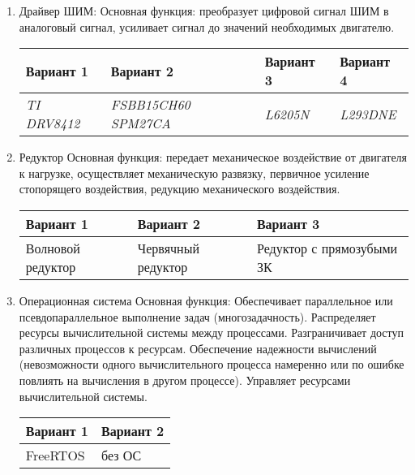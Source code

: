 \begin{enumerate}
    \item Драйвер ШИМ:
        Основная функция: преобразует цифровой сигнал ШИМ в аналоговый сигнал,
        усиливает сигнал до значений необходимых двигателю.

        \begin{tabular}{|p{3.5cm}|p{3.5cm}|p{3.5cm}|p{3.5cm}|}
            \hline
            Вариант 1 & Вариант 2 & Вариант 3 & Вариант 4 \\
            \hline
            \textit{TI DRV8412} &
            \textit{FSBB15CH60 SPM27CA} &
            \textit{L6205N} &
            \textit{L293DNE} \\
            \hline
        \end{tabular}

    \item Редуктор
        Основная функция: передает механическое воздействие от двигателя к
        нагрузке, осуществляет механическую развязку, первичное усиление
        стопорящего воздействия, редукцию механического воздействия.

        \begin{tabular}{|p{3.5cm}|p{3.5cm}|p{3.5cm}|}
            \hline
            Вариант 1 & Вариант 2 & Вариант 3 \\
            \hline
            Волновой редуктор &
            Червячный редуктор &
            Редуктор с прямозубыми ЗК \\
            \hline
        \end{tabular}

    \item Операционная система
        Основная функция: Обеспечивает параллельное или псевдопараллельное
        выполнение задач (многозадачность). Распределяет ресурсы вычислительной
        системы между процессами. Разграничивает доступ различных процессов к
        ресурсам. Обеспечение надежности вычислений (невозможности одного
        вычислительного процесса намеренно или по ошибке повлиять на вычисления
        в другом процессе). Управляет ресурсами вычислительной системы.

        \begin{tabular}{|p{3.5cm}|p{3.5cm}|}
            \hline
            Вариант 1 & Вариант 2 \\
            \hline
            FreeRTOS &
            без ОС \\
            \hline
        \end{tabular}
\end{enumerate}

